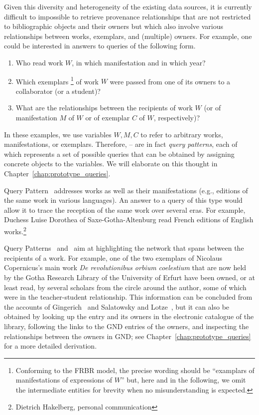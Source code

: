 Given this diversity and heterogeneity of the existing data sources,
it is currently difficult to impossible to retrieve provenance relationships
that are not restricted to bibliographic objects and their owners
but which also involve various relationships between works, exemplars, and (multiple) owners.
For example, one could be interested in answers to queries of the following form.
%
\begin{enumerate}
  \item[\exaquery{1}]
    Who read
    work $W$, in which manifestation and in which year?
  \item[\exaquery{2}]
    Which exemplars%
    \footnote{%
      Conforming to the FRBR model,
      the precise wording should be \enquote{examplars of manifestations of expressions of $W$}
      but, here and in the following,
      we omit the intermediate entities for brevity when no misunderstanding is expected.%
    }
    of work $W$
    were passed from one of its owners to a collaborator (or a student)?
  \item[\exaquery{3}]
    What are the relationships between the recipients of work $W$
    (or of manifestation $M$ of $W$ or of exemplar $C$ of $W$, respectively)?
\end{enumerate}
%
In these examples, we use variables $W,M,C$ to refer to arbitrary works,
manifestations, or exemplars. Therefore, -- are in fact
\emph{query patterns}, each of which represents a set of possible queries
that can be obtained by assigning concrete objects to the variables.
We will elaborate on this thought in Chapter~\ref{chap:prototype_queries}.

Query Pattern~ addresses works as well as their manifestations
(e.g., editions of the same work in various languages).
An answer to a query of this type would allow it to trace the reception
of the same work over several eras. For example, Duchess Luise Dorothea of Saxe-Gotha-Altenburg
read French editions of English works.\footnote{Dietrich Hakelberg, personal communication}

Query Patterns~ and~
aim at highlighting the network
that spans between the recipients of a work.
For example, one of the two exemplars of Nicolaus Copernicus's
main work \emph{De revolutionibus orbium coelestium} \autocite{Kopernikus1543}
that are now held by the Gotha Research Library of the University of Erfurt
have been owned, or at least read, by several scholars
from the circle around the author,
some of which were in the teacher-student relationship.
This information can be concluded
from the accounts of Gingerich~\autocite[p.\,69]{Gingerich2002}
and Salatowsky and Lotze~\autocite[p.\,142]{Salatowsky2015},
but it can also be obtained by looking up the entry and its owners in the electronic catalogue of the library,
following the links to the GND entries of the owners,
and inspecting the relationships between the owners in GND;
see Chapter~\ref{chap:prototype_queries} for a more detailed derivation.


